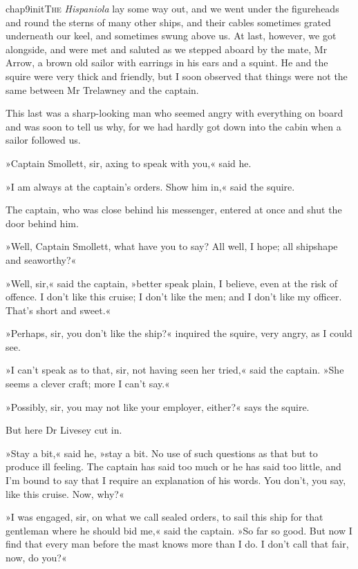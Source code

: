
   \lettrine[lines=4,image=true]{chap9initT}{he} \textit{Hispaniola} lay some way out, and we went under the figureheads and round the sterns of many other ships, and their cables sometimes grated underneath our keel, and sometimes swung above us. At last, however, we got alongside, and were met and saluted as we stepped aboard by the mate, Mr Arrow, a brown old sailor with earrings in his ears and a squint. He and the squire were very thick and friendly, but I soon observed that things were not the same between Mr Trelawney and the captain.

This last was a sharp-looking man who seemed angry with everything on board and was soon to tell us why, for we had hardly got down into the cabin when a sailor followed us.

»Captain Smollett, sir, axing to speak with you,« said he.

»I am always at the captain's orders. Show him in,« said the squire.

The captain, who was close behind his messenger, entered at once and shut the door behind him.

»Well, Captain Smollett, what have you to say? All well, I hope; all shipshape and seaworthy?«

»Well, sir,« said the captain, »better speak plain, I believe, even at the risk of offence. I don't like this cruise; I don't like the men; and I don't like my officer. That's short and sweet.«

»Perhaps, sir, you don't like the ship?« inquired the squire, very angry, as I could see.

»I can't speak as to that, sir, not having seen her tried,« said the captain. »She seems a clever craft; more I can't say.«

»Possibly, sir, you may not like your employer, either?« says the squire.

But here Dr Livesey cut in.

»Stay a bit,« said he, »stay a bit. No use of such questions as that but to produce ill feeling. The captain has said too much or he has said too little, and I'm bound to say that I require an explanation of his words. You don't, you say, like this cruise. Now, why?«

»I was engaged, sir, on what we call sealed orders, to sail this ship for that gentleman where he should bid me,« said the captain. »So far so good. But now I find that every man before the mast knows more than I do. I don't call that fair, now, do you?«

